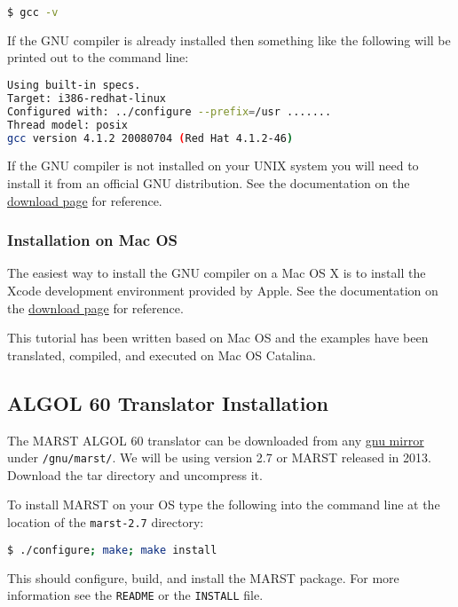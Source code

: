 \documentclass{article}
\begin{document}
\begin{lstlisting}[language=bash]
$ gcc -v
\end{lstlisting}

If the GNU compiler is already installed then something like the following will be printed out to the command line:

\begin{lstlisting}[language=bash]
Using built-in specs. 
Target: i386-redhat-linux 
Configured with: ../configure --prefix=/usr ....... 
Thread model: posix 
gcc version 4.1.2 20080704 (Red Hat 4.1.2-46)
\end{lstlisting}

If the GNU compiler is not installed on your UNIX system you will need to install it from an official GNU distribution. See the documentation on the \href{http://gcc.gnu.org/install/}{download page} for reference.

\subsubsection{Installation on Mac OS}
The easiest way to install the GNU compiler on a Mac OS X is to install the Xcode development environment provided by Apple. See the documentation on the \href{https://developer.apple.com/xcode/}{download page} for reference.

This tutorial has been written based on Mac OS and the examples have been translated, compiled, and executed on Mac OS Catalina.

\subsection{ALGOL 60 Translator Installation}
The MARST ALGOL 60 translator can be downloaded from any \href{https://www.gnu.org/prep/ftp.html}{gnu mirror} under \texttt{/gnu/marst/}. We will be using version 2.7 or MARST released in 2013. Download the tar directory and uncompress it.

To install MARST on your OS type the following into the command line at the location of the \texttt{marst-2.7} directory:

\begin{lstlisting}[language=bash]
$ ./configure; make; make install
\end{lstlisting}

This should configure, build, and install the MARST package. For more information see the \texttt{README} or the \texttt{INSTALL} file.
\end{document}
